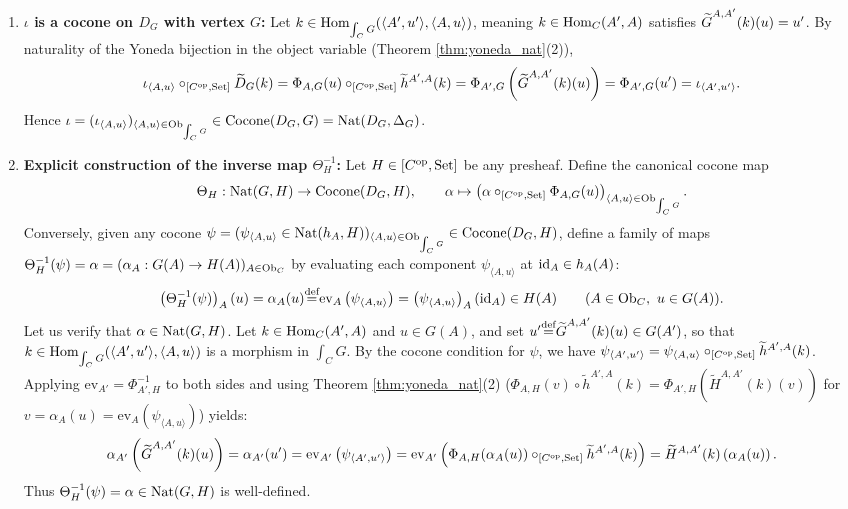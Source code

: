 \documentclass[10pt,a4paper]{article}
\begin{document}
\begin{enumerate}
\item \textbf{$\iota$ is a cocone on $D_G$ with vertex $G$:} Let $k \in {\textrm{Hom}}_{\int_C G}(\langle A', u' \rangle, \langle A, u \rangle)$, meaning $k \in {\textrm{Hom}}_C(A', A)$ satisfies ${\widetilde{G}\textrm{}}^{A,A'}(k)(u) = u'$. By naturality of the Yoneda bijection in the object variable (Theorem \ref{thm:yoneda_nat}(2)),
$$\iota_{\langle A, u \rangle} \circ_{[C^{\textrm{op}},{\textrm{Set}}]} \widetilde{D}_G(k) = \Phi_{A,G}(u) \circ_{[C^{\textrm{op}},{\textrm{Set}}]} \widetilde{h}^{A',A}(k) = \Phi_{A',G}\left({\widetilde{G}\textrm{}}^{A,A'}(k)(u)\right) = \Phi_{A',G}(u') = \iota_{\langle A', u' \rangle}.$$
Hence $\iota = (\iota_{\langle A,u\rangle})_{\langle A,u\rangle \in {\textrm{Ob}}_{\int_C G}} \in {\mathrm{Cocone}}(D_G, G) = {\textrm{Nat}}(D_G, \Delta_G)$.
\item \textbf{Explicit construction of the inverse map $\Theta_H^{-1}$:} Let $H \in [C^{\textrm{op}}, {\textrm{Set}}]$ be any presheaf. Define the canonical cocone map
$$\Theta_H : {\textrm{Nat}}(G, H) \to {\mathrm{Cocone}}(D_G, H), \qquad \alpha \mapsto \left(\alpha \circ_{[C^{\textrm{op}},{\textrm{Set}}]} \Phi_{A,G}(u)\right)_{\langle A, u \rangle \in {\textrm{Ob}}_{\int_C G}}.$$
Conversely, given any cocone $\psi = (\psi_{\langle A, u \rangle} \in {\textrm{Nat}}(h_A, H))_{\langle A, u \rangle \in {\textrm{Ob}}_{\int_C G}} \in {\mathrm{Cocone}}(D_G, H)$, define a family of maps $\Theta_H^{-1}(\psi) = \alpha = (\alpha_A : G(A) \to H(A))_{A \in {\textrm{Ob}}_C}$ by evaluating each component $\psi_{\langle A, u \rangle}$ at ${\textrm{id}}_A \in h_A(A)$:
$$\left(\Theta_H^{-1}(\psi)\right)_A(u) = \alpha_A(u) {\stackrel{{\textrm{def}}}{=}} \mathrm{ev}_A\left(\psi_{\langle A, u \rangle}\right) = \left(\psi_{\langle A, u \rangle}\right)_A({\textrm{id}}_A) \in H(A) \qquad (A \in {\textrm{Ob}}_C,\ u \in G(A)).$$
Let us verify that $\alpha \in {\textrm{Nat}}(G, H)$. Let $k \in {\textrm{Hom}}_C(A', A)$ and $u \in G(A)$, and set $u' {\stackrel{{\textrm{def}}}{=}} {\widetilde{G}\textrm{}}^{A,A'}(k)(u) \in G(A')$, so that $k \in {\textrm{Hom}}_{\int_C G}(\langle A', u' \rangle, \langle A, u \rangle)$ is a morphism in $\int_C G$. By the cocone condition for $\psi$, we have $\psi_{\langle A', u' \rangle} = \psi_{\langle A, u \rangle} \circ_{[C^{\textrm{op}},{\textrm{Set}}]} \widetilde{h}^{A',A}(k)$. Applying $\mathrm{ev}_{A'} = \Phi_{A',H}^{-1}$ to both sides and using Theorem \ref{thm:yoneda_nat}(2) ($\Phi_{A,H}(v) \circ \widetilde{h}^{A',A}(k) = \Phi_{A',H}(\widetilde{H}^{A,A'}(k)(v))$ for $v = \alpha_A(u) = \mathrm{ev}_A(\psi_{\langle A,u\rangle})$) yields:
$$\alpha_{A'}\left({\widetilde{G}\textrm{}}^{A,A'}(k)(u)\right) = \alpha_{A'}(u') = \mathrm{ev}_{A'}\left(\psi_{\langle A', u' \rangle}\right) = \mathrm{ev}_{A'}\left(\Phi_{A,H}(\alpha_A(u)) \circ_{[C^{\textrm{op}},{\textrm{Set}}]} \widetilde{h}^{A',A}(k)\right) = \widetilde{H}^{A,A'}(k)\left(\alpha_A(u)\right).$$
Thus $\Theta_H^{-1}(\psi) = \alpha \in {\textrm{Nat}}(G, H)$ is well-defined.

\end{enumerate}
\end{document}
